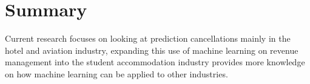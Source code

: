 \section{Summary}

Current research focuses on looking at prediction cancellations mainly in the hotel and aviation industry, expanding this use of machine learning on revenue management into the student accommodation industry provides more knowledge on how machine learning can be applied to other industries. 


